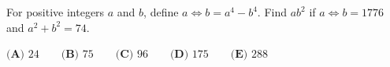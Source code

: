 For positive integers $a$ and $b$, define $a\Longleftrightarrow b=a^4-b^4$. Find $ab^2$ if $a\Longleftrightarrow b=1776$ and $a^2+b^2=74$.

$\textbf{(A) }24\qquad\textbf{(B) }75\qquad\textbf{(C) }96\qquad\textbf{(D) }175\qquad\textbf{(E) }288$
